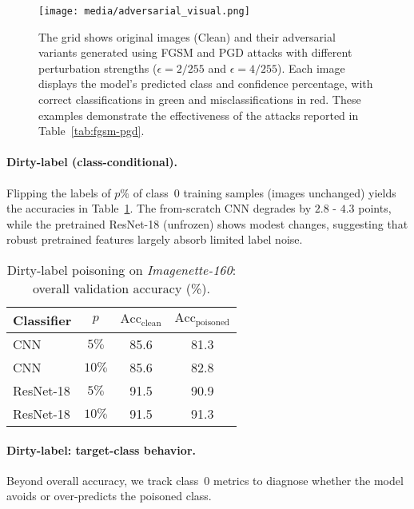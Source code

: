 \documentclass{article}
\begin{document}
\begin{figure*}[t]
  \centering
  \texttt{[image: media/adversarial\_visual.png]}
  \caption{The grid shows original images (Clean) and their adversarial variants generated using FGSM and PGD attacks with different perturbation strengths ($\epsilon=2/255$ and $\epsilon=4/255$). Each image displays the model's predicted class and confidence percentage, with correct classifications in green and misclassifications in red. These examples demonstrate the effectiveness of the attacks reported in Table~\ref{tab:fgsm-pgd}.}
  \label{fig:adversarial_visual}
\end{figure*}

\paragraph{Dirty-label (class-conditional).}
Flipping the labels of $p\%$ of class~0 training samples (images unchanged) yields the accuracies in Table~\ref{tab:dirtylabel}.
The from-scratch CNN degrades by $2.8$ - $4.3$ points, while the pretrained ResNet-18 (unfrozen) shows modest changes, suggesting that robust pretrained features largely absorb limited label noise.

\begin{table}[H]
  \caption{Dirty-label poisoning on \textit{Imagenette-160}: overall validation accuracy (\%).}
  \label{tab:dirtylabel}
  \centering
  \begin{small}
    \begin{tabular}{lccc}
      \toprule
      Classifier            & $p$  & $\text{Acc}_{\text{clean}}$ & $\text{Acc}_{\text{poisoned}}$ \\
      \midrule
      CNN              & $5\%$  & 85.6 & 81.3 \\
      CNN              & $10\%$ & 85.6 & 82.8 \\
      ResNet-18\footnotemark[5] & $5\%$  & 91.5 & 90.9 \\
      ResNet-18\footnotemark[5] & $10\%$ & 91.5 & 91.3 \\
      \bottomrule
    \end{tabular}
  \end{small}
  \vspace{-0.35cm}
\end{table}


\paragraph{Dirty-label: target-class behavior.}
Beyond overall accuracy, we track class~0 metrics to diagnose whether the model avoids or over-predicts the poisoned class. 
\end{document}
